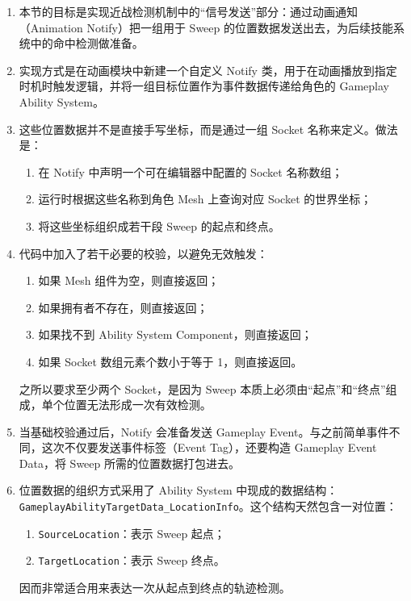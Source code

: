\begin{enumerate}
	\item 本节的目标是实现近战检测机制中的“信号发送”部分：通过动画通知（Animation Notify）把一组用于 Sweep 的位置数据发送出去，为后续技能系统中的命中检测做准备。
	
	\item 实现方式是在动画模块中新建一个自定义 Notify 类，用于在动画播放到指定时机时触发逻辑，并将一组目标位置作为事件数据传递给角色的 Gameplay Ability System。
	
	\item 这些位置数据并不是直接手写坐标，而是通过一组 Socket 名称来定义。做法是：
	\begin{enumerate}
		\item 在 Notify 中声明一个可在编辑器中配置的 Socket 名称数组；
		\item 运行时根据这些名称到角色 Mesh 上查询对应 Socket 的世界坐标；
		\item 将这些坐标组织成若干段 Sweep 的起点和终点。
	\end{enumerate}
	
	\item 代码中加入了若干必要的校验，以避免无效触发：
	\begin{enumerate}
		\item 如果 Mesh 组件为空，则直接返回；
		\item 如果拥有者不存在，则直接返回；
		\item 如果找不到 Ability System Component，则直接返回；
		\item 如果 Socket 数组元素个数小于等于 1，则直接返回。
	\end{enumerate}
	之所以要求至少两个 Socket，是因为 Sweep 本质上必须由“起点”和“终点”组成，单个位置无法形成一次有效检测。
	
	\item 当基础校验通过后，Notify 会准备发送 Gameplay Event。与之前简单事件不同，这次不仅要发送事件标签（Event Tag），还要构造 Gameplay Event Data，将 Sweep 所需的位置数据打包进去。
	
	\item 位置数据的组织方式采用了 Ability System 中现成的数据结构：\texttt{GameplayAbilityTargetData\_LocationInfo}。这个结构天然包含一对位置：
	\begin{enumerate}
		\item \texttt{SourceLocation}：表示 Sweep 起点；
		\item \texttt{TargetLocation}：表示 Sweep 终点。
	\end{enumerate}
	因而非常适合用来表达一次从起点到终点的轨迹检测。
	

\end{enumerate}
